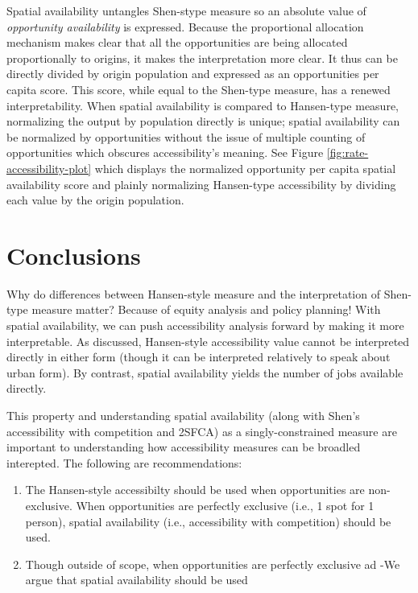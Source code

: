 \documentclass[]{elsarticle} %
\providecommand{\tightlist}{%
  \setlength{\itemsep}{0pt}\setlength{\parskip}{0pt}}
\begin{document}
Spatial availability untangles Shen-stype measure so an absolute value
of \emph{opportunity availability} is expressed. Because the
proportional allocation mechanism makes clear that all the opportunities
are being allocated proportionally to origins, it makes the
interpretation more clear. It thus can be directly divided by origin
population and expressed as an opportunities per capita score. This
score, while equal to the Shen-type measure, has a renewed
interpretability. When spatial availability is compared to Hansen-type
measure, normalizing the output by population directly is unique;
spatial availability can be normalized by opportunities without the
issue of multiple counting of opportunities which obscures
accessibility's meaning. See Figure \ref{fig:rate-accessibility-plot}
which displays the normalized opportunity per capita spatial
availability score and plainly normalizing Hansen-type accessibility by
dividing each value by the origin population.

\newpage

\hypertarget{conclusions}{%
\section{Conclusions}\label{conclusions}}

Why do differences between Hansen-style measure and the interpretation
of Shen-type measure matter? Because of equity analysis and policy
planning! With spatial availability, we can push accessibility analysis
forward by making it more interpretable. As discussed, Hansen-style
accessibility value cannot be interpreted directly in either form
(though it can be interpreted relatively to speak about urban form). By
contrast, spatial availability yields the number of jobs available
directly.

This property and understanding spatial availability (along with Shen's
accessibility with competition and 2SFCA) as a singly-constrained
measure are important to understanding how accessibility measures can be
broadled interepted. The following are recommendations:

\begin{enumerate}
\def\labelenumi{\arabic{enumi})}
\tightlist
\item
  The Hansen-style accessibilty should be used when opportunities are
  non-exclusive. When opportunities are perfectly exclusive (i.e., 1
  spot for 1 person), spatial availability (i.e., accessibility with
  competition) should be used.
\item
  Though outside of scope, when opportunities are perfectly exclusive ad
  -We argue that spatial availability should be used
\end{enumerate}
\end{document}
